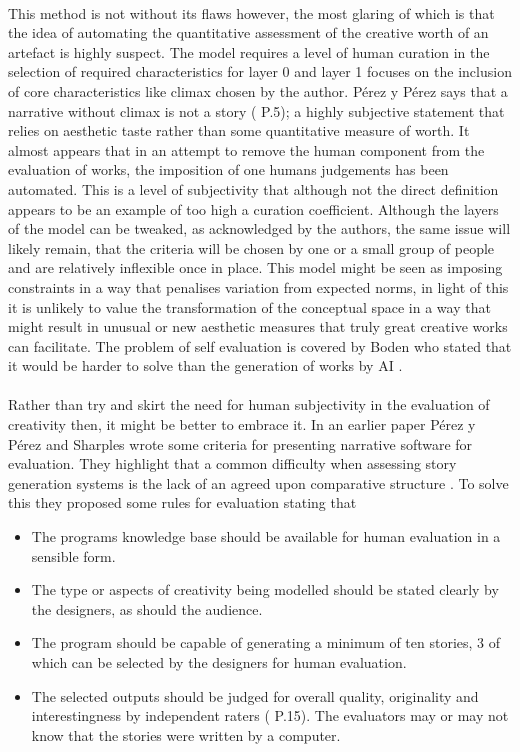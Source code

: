 \documentclass[letterpaper]{article}
\begin{document}
\\This method is not without its flaws however, the most glaring of which is that the idea of automating the quantitative assessment of the creative worth of an artefact is highly suspect. The model requires a level of human curation in the selection of required characteristics for layer 0 and layer 1 focuses on the inclusion of core characteristics like climax chosen by the author. P\'erez y P\'erez says that a narrative without climax is not a story (\cite{y2014three} P.5); a highly subjective statement that relies on aesthetic taste rather than some quantitative measure of worth. It almost appears that in an attempt to remove the human component from the evaluation of works, the imposition of one humans judgements has been automated. This is a level of subjectivity that although not the direct definition appears to be an example of too high a curation coefficient. Although the layers of the model can be tweaked, as acknowledged by the authors, the same issue will likely remain, that the criteria will be chosen by one or a small group of people and are relatively inflexible once in place. This model might be seen as imposing constraints in a way that penalises variation from expected norms, in light of this it is unlikely to value the transformation of the conceptual space in a way that might result in unusual or new aesthetic measures that truly great creative works can facilitate. The problem of self evaluation is covered by Boden who stated that it would be harder to solve than the generation of works by AI \cite{BODEN1998347}.\\
\\Rather than try and skirt the need for human subjectivity in the evaluation of creativity then, it might be better to embrace it. In an earlier paper P\'erez y P\'erez and Sharples wrote some criteria for presenting narrative software for evaluation. They highlight that a common difficulty when assessing story generation systems is the lack of an agreed upon comparative structure \cite{PEREZYPEREZ200415}. To solve this they proposed some rules for evaluation stating that
\begin{itemize}
\item The programs knowledge base should be available for human evaluation in a sensible form.
\item The type or aspects of creativity being modelled should be stated clearly by the designers, as should the audience.
\item The program should be capable of generating a minimum of ten stories, 3 of which can be selected by the designers for human evaluation.
\item The selected outputs should be judged for overall quality, originality and interestingness by independent raters (\cite{PEREZYPEREZ200415} P.15). The evaluators may or may not know that the stories were written by a computer.
\end{itemize}
\end{document}
